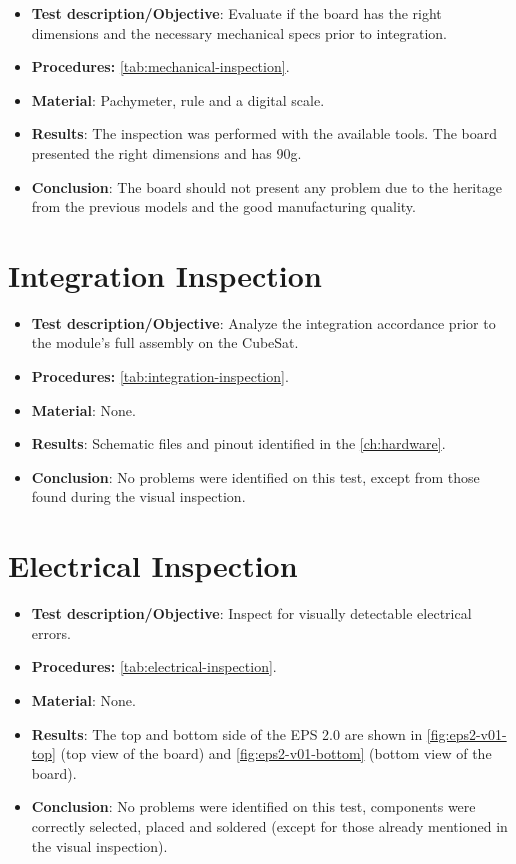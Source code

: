 \begin{itemize}
    \item \textbf{Test description/Objective}: Evaluate if the board has the right dimensions and the necessary mechanical specs prior to integration.
    \item \textbf{Procedures:} \autoref{tab:mechanical-inspection}.
    \item \textbf{Material}: Pachymeter, rule and a digital scale.
    \item \textbf{Results}: The inspection was performed with the available tools. The board presented the right dimensions and has 90g.
    \item \textbf{Conclusion}: The board should not present any problem due to the heritage from the previous models and the good manufacturing quality.
\end{itemize}


\section{Integration Inspection}

\begin{itemize}
    \item \textbf{Test description/Objective}: Analyze the integration accordance prior to the module’s full assembly on the CubeSat.
    \item \textbf{Procedures:} \autoref{tab:integration-inspection}.
    \item \textbf{Material}: None.
    \item \textbf{Results}: Schematic files and pinout identified in the \autoref{ch:hardware}. 
    \item \textbf{Conclusion}: No problems were identified on this test, except from those found during the visual inspection.
\end{itemize}


\section{Electrical Inspection}

\begin{itemize}
    \item \textbf{Test description/Objective}: Inspect for visually detectable electrical errors.
    \item \textbf{Procedures:} \autoref{tab:electrical-inspection}.
    \item \textbf{Material}: None.
    \item \textbf{Results}: The top and bottom side of the EPS 2.0 are shown in \autoref{fig:eps2-v01-top} (top view of the board) and \autoref{fig:eps2-v01-bottom} (bottom view of the board).
    \item \textbf{Conclusion}: No problems were identified on this test, components were correctly selected, placed and soldered (except for those already mentioned in the visual inspection).
\end{itemize}

